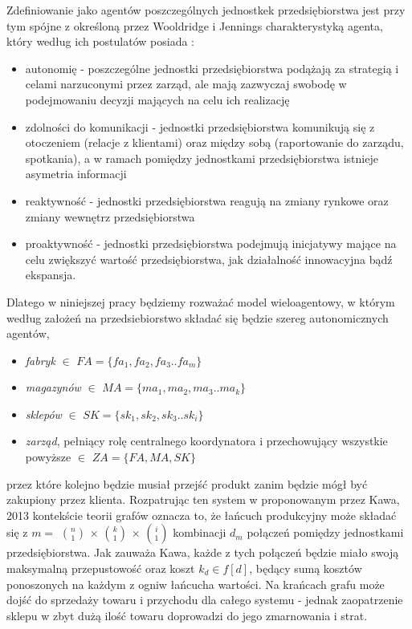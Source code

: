 \documentclass{article}
\begin{document}
Zdefiniowanie jako agentów poszczególnych jednostkek przedsiębiorstwa jest przy tym spójne z określoną przez Wooldridge i Jennings charakterystyką agenta, który według ich postulatów posiada : 
	\begin{itemize}
		\item autonomię - poszczególne jednostki przedsiębiorstwa podążają za strategią i celami narzuconymi przez zarząd, ale mają zazwyczaj swobodę w podejmowaniu decyzji mających na celu ich realizację
		\item zdolności do komunikacji - jednostki przedsiębiorstwa komunikują się z otoczeniem (relacje z klientami) oraz między sobą (raportowanie do zarządu, spotkania), a w ramach pomiędzy jednostkami przedsiębiorstwa istnieje asymetria informacji
		\item reaktywność - jednostki przedsiębiorstwa reagują na zmiany rynkowe oraz zmiany wewnętrz przedsiębiorstwa
	 	\item proaktywność - jednostki przedsiębiorstwa podejmują inicjatywy mające na celu zwiększyć wartość przedsiębiorstwa, jak działalność innowacyjna bądź ekspansja. 
	\end{itemize}
 
 Dlatego w niniejszej pracy będziemy rozważać model wieloagentowy, w którym według założeń na przedsiebiorstwo składać się będzie szereg autonomicznych agentów,
	\begin{itemize} 
		\item \textit{fabryk} $\in$ $FA = \{fa_1,fa_2,fa_3..fa_m\} $ 
		\item \textit{magazynów} $\in$ $MA = \{ma_1,ma_2,ma_3..ma_k\} $ 
		\item \textit{sklepów} $\in$ $SK = \{sk_1,sk_2,sk_3..sk_i\} $
		\item \textit{zarząd}, pełniący rolę centralnego koordynatora i przechowujący wszystkie powyższe $\in$ $ZA = \{FA,MA,SK\} $
	\end{itemize}

przez które kolejno będzie musiał przejść produkt zanim będzie mógł być zakupiony przez klienta. Rozpatrując ten system w proponowanym przez Kawa, 2013 kontekście teorii grafów oznacza to, że łańcuch produkcyjny może składać się z $m= $ $n\choose 1 $ $ \times $ $k\choose 1 $ $ \times $ $i\choose 1 $ kombinacji $d_m$ połączeń pomiędzy jednostkami przedsiębiorstwa. Jak zauważa Kawa, każde z tych połączeń będzie miało swoją maksymalną przepustowość oraz koszt $k_d \in f[d]$, będący sumą kosztów ponoszonych na każdym z ogniw łańcucha wartości. Na krańcach grafu może dojść do sprzedaży towaru i przychodu dla całego systemu - jednak zaopatrzenie sklepu w zbyt dużą ilość towaru doprowadzi do jego zmarnowania i strat. 
\end{document}
